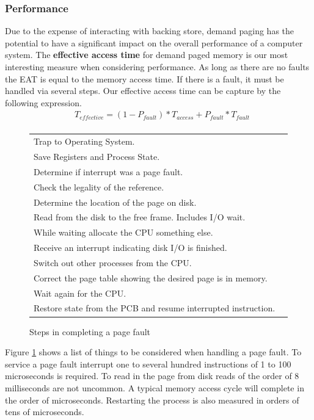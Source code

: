 \documentclass[10pt,a4paper]{article}
\begin{document}
\subsubsection{Performance}
Due to the expense of interacting with backing store, demand paging has the potential to have a significant impact on the overall performance of a computer system. The {\bf effective access time} for demand paged memory is our most interesting measure when considering performance. As long as there are no faults the EAT is equal to the memory access time. If there is a fault, it must be handled via several steps. Our effective access time can be capture by the following expression.
\begin{equation}
\begin{split}
&T_{effective} = (1 - P_{fault}) * T_{access} + P_{fault} * T_{fault}\\
\end{split}
\end{equation}
\newline\newline
\begin{figure}
\caption{Steps in completing a page fault}
\begin{center}
\begin{tabular}{| l | l | }
  \hline
  Trap to Operating System. \\
  Save Registers and Process State. \\
  Determine if interrupt was a page fault. \\
  Check the legality of the reference. \\
  Determine the location of the page on disk. \\
  Read from the disk to the free frame. Includes I/O wait. \\
  While waiting allocate the CPU something else. \\
  Receive an interrupt indicating disk I/O is finished.  \\
  Switch out other processes from the CPU. \\
  Correct the page table showing the desired page is in memory. \\
  Wait again for the CPU. \\  
  Restore state from the PCB and resume interrupted instruction. \\
  \hline
\end{tabular}
\label{pfsteps}
\end{center}
\end{figure}
Figure \ref{pfsteps} shows a list of things to be considered when handling a page fault. To service a page fault interrupt one to several hundred instructions of 1 to 100 microseconds is required. To read in the page from disk reads of the order of 8 milliseconds are not uncommon. A typical memory access cycle will complete in the order of microseconds. Restarting the process is also measured in orders of tens of microseconds.   



{}

\begin{center}
\end{center}
\end{document}
